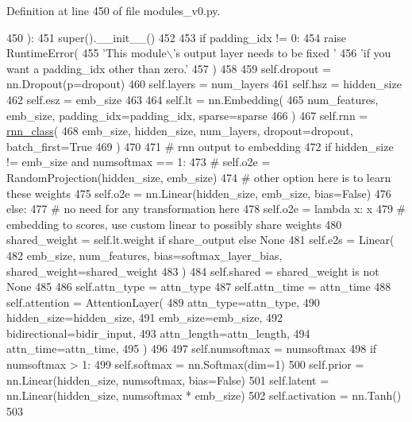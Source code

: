 Definition at line 450 of file modules\+\_\+v0.\+py.


\begin{DoxyCode}
450     ):
451         super().\_\_init\_\_()
452 
453         \textcolor{keywordflow}{if} padding\_idx != 0:
454             \textcolor{keywordflow}{raise} RuntimeError(
455                 \textcolor{stringliteral}{'This module\(\backslash\)'s output layer needs to be fixed '}
456                 \textcolor{stringliteral}{'if you want a padding\_idx other than zero.'}
457             )
458 
459         self.dropout = nn.Dropout(p=dropout)
460         self.layers = num\_layers
461         self.hsz = hidden\_size
462         self.esz = emb\_size
463 
464         self.lt = nn.Embedding(
465             num\_features, emb\_size, padding\_idx=padding\_idx, sparse=sparse
466         )
467         self.rnn = \hyperlink{namespaceseq2seq_1_1train_a1b062073c766f1d34a67f572ef256ba0}{rnn\_class}(
468             emb\_size, hidden\_size, num\_layers, dropout=dropout, batch\_first=\textcolor{keyword}{True}
469         )
470 
471         \textcolor{comment}{# rnn output to embedding}
472         \textcolor{keywordflow}{if} hidden\_size != emb\_size \textcolor{keywordflow}{and} numsoftmax == 1:
473             \textcolor{comment}{# self.o2e = RandomProjection(hidden\_size, emb\_size)}
474             \textcolor{comment}{# other option here is to learn these weights}
475             self.o2e = nn.Linear(hidden\_size, emb\_size, bias=\textcolor{keyword}{False})
476         \textcolor{keywordflow}{else}:
477             \textcolor{comment}{# no need for any transformation here}
478             self.o2e = \textcolor{keyword}{lambda} x: x
479         \textcolor{comment}{# embedding to scores, use custom linear to possibly share weights}
480         shared\_weight = self.lt.weight \textcolor{keywordflow}{if} share\_output \textcolor{keywordflow}{else} \textcolor{keywordtype}{None}
481         self.e2s = Linear(
482             emb\_size, num\_features, bias=softmax\_layer\_bias, shared\_weight=shared\_weight
483         )
484         self.shared = shared\_weight \textcolor{keywordflow}{is} \textcolor{keywordflow}{not} \textcolor{keywordtype}{None}
485 
486         self.attn\_type = attn\_type
487         self.attn\_time = attn\_time
488         self.attention = AttentionLayer(
489             attn\_type=attn\_type,
490             hidden\_size=hidden\_size,
491             emb\_size=emb\_size,
492             bidirectional=bidir\_input,
493             attn\_length=attn\_length,
494             attn\_time=attn\_time,
495         )
496 
497         self.numsoftmax = numsoftmax
498         \textcolor{keywordflow}{if} numsoftmax > 1:
499             self.softmax = nn.Softmax(dim=1)
500             self.prior = nn.Linear(hidden\_size, numsoftmax, bias=\textcolor{keyword}{False})
501             self.latent = nn.Linear(hidden\_size, numsoftmax * emb\_size)
502             self.activation = nn.Tanh()
503 
\end{DoxyCode}



